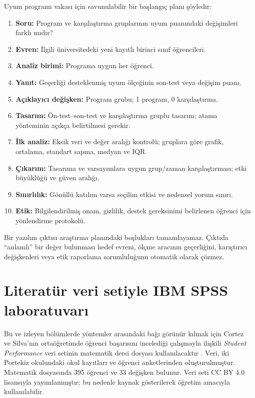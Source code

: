 Uyum programı vakası için savunulabilir bir başlangıç planı şöyledir:

\begin{enumerate}
  \item \textbf{Soru:} Program ve karşılaştırma gruplarının uyum puanındaki değişimleri farklı mıdır?
  \item \textbf{Evren:} İlgili üniversitedeki yeni kayıtlı birinci sınıf öğrencileri.
  \item \textbf{Analiz birimi:} Programa uygun her öğrenci.
  \item \textbf{Yanıt:} Geçerliği desteklenmiş uyum ölçeğinin son-test veya değişim puanı.
  \item \textbf{Açıklayıcı değişken:} Program grubu; 1 program, 0 karşılaştırma.
  \item \textbf{Tasarım:} Ön-test--son-test ve karşılaştırma gruplu tasarım; atama yönteminin açıkça belirtilmesi gerekir.
  \item \textbf{İlk analiz:} Eksik veri ve değer aralığı kontrolü; gruplara göre grafik, ortalama, standart sapma, medyan ve IQR.
  \item \textbf{Çıkarım:} Tasarıma ve varsayımlara uygun grup/zaman karşılaştırması; etki büyüklüğü ve güven aralığı.
  \item \textbf{Sınırlılık:} Gönüllü katılım varsa seçilim etkisi ve nedensel yorum sınırı.
  \item \textbf{Etik:} Bilgilendirilmiş onam, gizlilik, destek gereksinimi belirlenen öğrenci için yönlendirme protokolü.
\end{enumerate}

\begin{outputguidebox}
Bir yazılım çıktısı araştırma planındaki boşlukları tamamlayamaz. Çıktıda
``anlamlı'' bir değer bulunması hedef evreni, ölçme aracının geçerliğini,
karıştırıcı değişkenleri veya etik raporlama sorumluluğunu otomatik olarak
çözmez.
\end{outputguidebox}

\section{Literatür veri setiyle IBM SPSS laboratuvarı}

Bu ve izleyen bölümlerde yöntemler arasındaki bağı görünür kılmak için Cortez
ve Silva'nın ortaöğretimde öğrenci başarısını incelediği çalışmayla ilişkili
\emph{Student Performance} veri setinin matematik dersi dosyası
kullanılacaktır \cite{cortezsilva2008,cortez2008data}. Veri, iki Portekiz
okulundaki okul kayıtları ve öğrenci anketlerinden oluşturulmuştur. Matematik
dosyasında 395 öğrenci ve 33 değişken bulunur. Veri seti CC BY 4.0 lisansıyla
yayımlanmıştır; bu nedenle kaynak gösterilerek öğretim amacıyla kullanılabilir.

